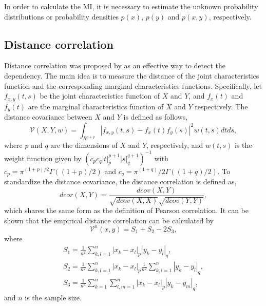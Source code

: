 \documentclass{bioinfo}
\begin{document}
In order to calculate the MI, it is necessary to estimate the unknown probability distributions or probability densities $p(x)$, $p(y)$ and $p(x,y)$, respectively.

\subsection{Distance correlation}
Distance correlation was proposed by \cite{szekely2007measuring} as an effective way to detect the dependency. The main
idea is to measure the distance of the joint characteristics function
and the corresponding marginal characteristics functions. Specifically,
let $f_{x,y}(t,s)$ be the joint characteristics function of $X$
and $Y$, and $f_x(t)$ and $f_y(t)$ are the marginal characteristics
function of $X$ and $Y$ respectively.  The distance
covariance between $X$ and $Y$ is defined as follows,
$$\mathcal{V}(X,Y,w)=\int_{R^{p+q}}|f_{x,y}(t,s)-f_x(t)f_y(s)|^2
w(t,s)dtds,$$ where $p$ and $q$ are the dimensions of $X$ and $Y$,
respectively, and $w(t,s)$ is the weight function given by $(c_p c_q
|t|_p^{p+1}|s|_q^{q+1})^{-1}$ with
$c_p=\pi^{(1+p)/2}\Gamma((1+p)/2)$ and
$c_q=\pi^{(1+q)}/2\Gamma((1+q)/2)$. To standardize the distance
covariance, the distance correlation is defined as,
$$dcor(X,Y)=\frac{dcov(X,Y)}{\sqrt{dcov(X,X)}\sqrt{dcov(Y,Y)}},$$
which shares the same form as the definition of Pearson correlation. It can be shown that the
empirical distance correlation can be calculated by
$$\mathcal{V}^n(x,y)=S_1+S_2-2S_3,$$
where
\begin{align*}
S_1=\frac{1}{n^2}\sum_{k,l=1}^{n}|x_k-x_l|_p|y_k-y_l|_q,\\
S_2=\frac{1}{n^2}\sum_{k,l=1}^{n}|x_k-x_l|_p\frac{1}{n^2}\sum_{k,l=1}^n|y_k-y_l|_q,\\
S_3=\frac{1}{n^3}\sum_{k=1}^{n}\sum_{l,m=1}^n|x_k-x_l|_p|y_k-y_m|_q,
\end{align*}
and $n$ is the sample size.
\end{document}
